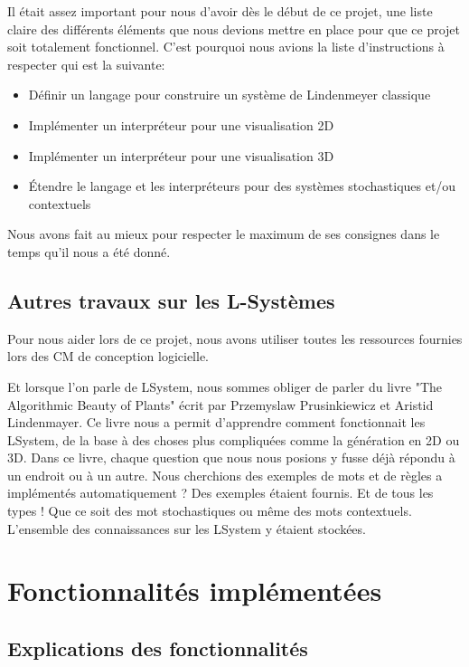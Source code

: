\documentclass[a4paper,12pt]{article}
\begin{document}
Il était assez important pour nous d'avoir dès le début de ce projet, une liste claire des différents éléments que nous devions mettre en place pour que ce projet soit totalement fonctionnel. C'est pourquoi nous avions la liste d'instructions à respecter qui est la suivante: 
\begin{itemize}[label=\textbullet, font=\small]
    \item Définir un langage pour construire un système de Lindenmeyer classique
    \item Implémenter un interpréteur pour une visualisation 2D
    \item Implémenter un interpréteur pour une visualisation 3D
    \item Étendre le langage et les interpréteurs pour des systèmes stochastiques et/ou contextuels
\end{itemize}
Nous avons fait au mieux pour respecter le maximum de ses consignes dans le temps qu'il nous a été donné.


\subsection{Autres travaux sur les L-Systèmes}

Pour nous aider lors de ce projet, nous avons utiliser toutes les ressources fournies lors des CM de conception logicielle. 

Et lorsque l'on parle de LSystem, nous sommes obliger de parler du livre "The Algorithmic Beauty
of Plants" écrit par Przemyslaw Prusinkiewicz et Aristid Lindenmayer. Ce livre nous a permit d'apprendre comment fonctionnait les LSystem, de la base à des choses plus compliquées comme la génération en 2D ou 3D. Dans ce livre, chaque question que nous nous posions y fusse déjà répondu à un endroit ou à un autre. Nous cherchions des exemples de mots et de règles a implémentés automatiquement ? Des exemples étaient fournis. Et de tous les types ! Que ce soit des mot stochastiques ou même des mots contextuels. L'ensemble des connaissances sur les LSystem y étaient stockées.



\section{Fonctionnalités implémentées}
\subsection{Explications des fonctionnalités}
\end{document}
